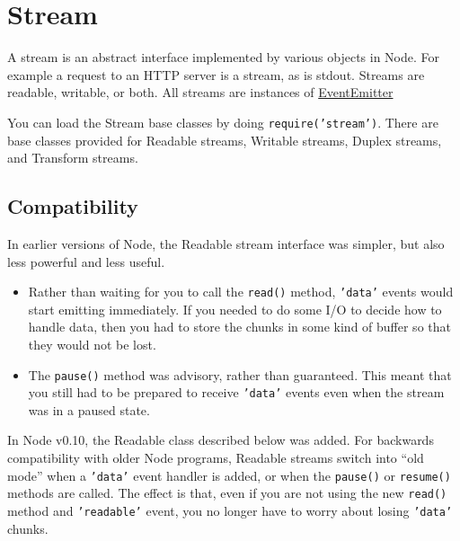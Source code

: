 \section{Stream}

\begin{Shaded}
\begin{Highlighting}[]
\NormalTok{: } 
\end{Highlighting}
\end{Shaded}

A stream is an abstract interface implemented by various objects in
Node. For example a request to an HTTP server is a stream, as is stdout.
Streams are readable, writable, or both. All streams are instances of
\href{events.html\#events\_class\_events\_eventemitter}{EventEmitter}

You can load the Stream base classes by doing
\texttt{require('stream')}. There are base classes provided for Readable
streams, Writable streams, Duplex streams, and Transform streams.

\subsection{Compatibility}

In earlier versions of Node, the Readable stream interface was simpler,
but also less powerful and less useful.

\begin{itemize}
\item
  Rather than waiting for you to call the \texttt{read()} method,
  \texttt{'data'} events would start emitting immediately. If you needed
  to do some I/O to decide how to handle data, then you had to store the
  chunks in some kind of buffer so that they would not be lost.
\item
  The \texttt{pause()} method was advisory, rather than guaranteed. This
  meant that you still had to be prepared to receive \texttt{'data'}
  events even when the stream was in a paused state.
\end{itemize}

In Node v0.10, the Readable class described below was added. For
backwards compatibility with older Node programs, Readable streams
switch into ``old mode'' when a \texttt{'data'} event handler is added,
or when the \texttt{pause()} or \texttt{resume()} methods are called.
The effect is that, even if you are not using the new \texttt{read()}
method and \texttt{'readable'} event, you no longer have to worry about
losing \texttt{'data'} chunks.

